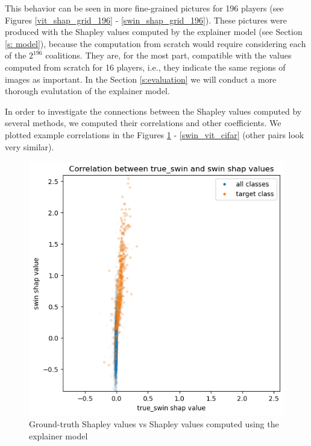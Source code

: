 \documentclass[magisterska,en]{pracamgr}
\begin{document}
\pagebreak



This behavior can be seen in more fine-grained pictures for 196 players (see Figures \ref{vit_shap_grid_196} - \ref{swin_shap_grid_196}). These pictures were produced with the Shapley values computed by the explainer model (see Section \ref{s: model}), because the computation from scratch would require considering each of the $2^{196}$ coalitions. They are, for the most part, compatible with the values computed from scratch for 16 players, i.e., they indicate the same regions of images as important. In the Section \ref{s:evaluation} we will conduct a more thorough evalutation of the explainer model.




In order to investigate the connections between the Shapley values computed by several methods, we computed their correlations and other coefficients. We plotted example correlations in the Figures \ref{true_swin_swin_cifar} - \ref{swin_vit_cifar} (other pairs look very similar).



\begin{figure}[H]
\centering
\includegraphics[scale=0.5]{./images/true_swin_swin_cifar.png}
\caption{Ground-truth Shapley values vs Shapley values computed using the explainer model}
\label{true_swin_swin_cifar}
\end{figure}
\end{document}

